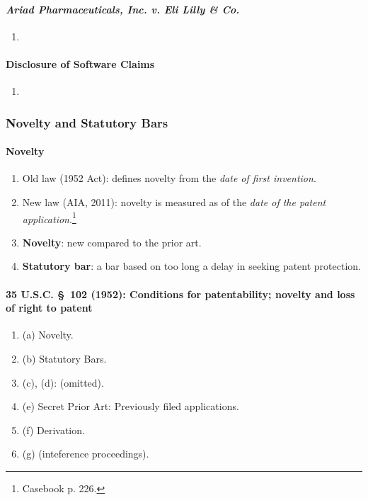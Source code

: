 \paragraph{\emph{Ariad Pharmaceuticals, Inc. v. Eli Lilly \& Co.}} %

\begin{enumerate}
    \item 
\end{enumerate}

\paragraph{Disclosure of Software Claims} %

\begin{enumerate}
    \item 
\end{enumerate}

\subsubsection{Novelty and Statutory Bars}

\paragraph{Novelty}

\begin{enumerate}
    \item Old law (1952 Act): defines novelty from the \emph{date of first 
    invention}.
    \item New law (AIA, 2011): novelty is measured as of the \emph{date of the 
    patent application}.\footnote{Casebook p. 226.}
    \item \textbf{Novelty}: new compared to the prior art.
    \item \textbf{Statutory bar}: a bar based on too long a delay in seeking 
    patent protection.
\end{enumerate}

\paragraph{35 U.S.C. \S\ 102 (1952): Conditions for patentability; novelty and 
loss of right to patent}

\begin{enumerate}
    \item (a) Novelty.
    \item (b) Statutory Bars.
    \item (c), (d): (omitted).
    \item (e) Secret Prior Art: Previously filed applications.
    \item (f) Derivation.
    \item (g) (inteference proceedings).
\end{enumerate}

